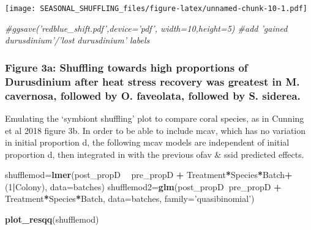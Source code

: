 \documentclass[]{article}
\newenvironment{Shaded}{\begin{snugshade}}{\end{snugshade}}
\newcommand{\CommentTok}[1]{\textcolor[rgb]{0.56,0.35,0.01}{\textit{#1}}}
\newcommand{\DataTypeTok}[1]{\textcolor[rgb]{0.13,0.29,0.53}{#1}}
\newcommand{\DecValTok}[1]{\textcolor[rgb]{0.00,0.00,0.81}{#1}}
\newcommand{\KeywordTok}[1]{\textcolor[rgb]{0.13,0.29,0.53}{\textbf{#1}}}
\newcommand{\NormalTok}[1]{#1}
\newcommand{\OperatorTok}[1]{\textcolor[rgb]{0.81,0.36,0.00}{\textbf{#1}}}
\newcommand{\StringTok}[1]{\textcolor[rgb]{0.31,0.60,0.02}{#1}}
\begin{document}
\texttt{[image: SEASONAL\_SHUFFLING\_files/figure-latex/unnamed-chunk-10-1.pdf]}

\begin{Shaded}
\begin{Highlighting}[]
\CommentTok{#ggsave('redblue_shift.pdf',device='pdf', width=10,height=5) #add 'gained durusdinium'/'lost durusdinium' labels}
\end{Highlighting}
\end{Shaded}

\hypertarget{figure-3a-shuffling-towards-high-proportions-of-durusdinium-after-heat-stress-recovery-was-greatest-in-m.-cavernosa-followed-by-o.-faveolata-followed-by-s.-siderea.}{%
\subsubsection{Figure 3a: Shuffling towards high proportions of
Durusdinium after heat stress recovery was greatest in M. cavernosa,
followed by O. faveolata, followed by S.
siderea.}\label{figure-3a-shuffling-towards-high-proportions-of-durusdinium-after-heat-stress-recovery-was-greatest-in-m.-cavernosa-followed-by-o.-faveolata-followed-by-s.-siderea.}}

Emulating the `symbiont shuffling' plot to compare coral species, as in
Cunning et al 2018 figure 3b. In order to be able to include mcav, which
has no variation in initial proportion d, the following mcav models are
independent of initial proportion d, then integrated in with the
previous ofav \& ssid predicted effects.

\begin{Shaded}
\begin{Highlighting}[]
\NormalTok{shufflemod=}\KeywordTok{lmer}\NormalTok{(post_propD }\OperatorTok{~}\StringTok{ }\NormalTok{pre_propD }\OperatorTok{+}\StringTok{ }\NormalTok{Treatment}\OperatorTok{*}\NormalTok{Species}\OperatorTok{*}\NormalTok{Batch}\OperatorTok{+}\NormalTok{(}\DecValTok{1}\OperatorTok{|}\NormalTok{Colony),}
                 \DataTypeTok{data=}\NormalTok{batches)}
\NormalTok{shufflemod2=}\KeywordTok{glm}\NormalTok{(post_propD}\OperatorTok{~}\NormalTok{pre_propD }\OperatorTok{+}\StringTok{ }\NormalTok{Treatment}\OperatorTok{*}\NormalTok{Species}\OperatorTok{*}\NormalTok{Batch, }\DataTypeTok{data=}\NormalTok{batches, }\DataTypeTok{family=}\StringTok{'quasibinomial'}\NormalTok{)}

\KeywordTok{plot_resqq}\NormalTok{(shufflemod) }
\end{Highlighting}
\end{Shaded}
\end{document}

